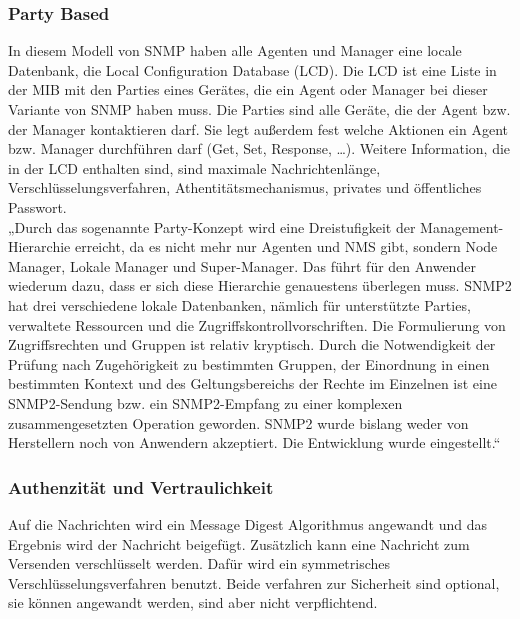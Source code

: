 \documentclass[11pt,a4paper]{article}
\begin{document}
\subsubsection{Party Based}
In diesem Modell von SNMP haben alle Agenten und Manager eine locale Datenbank, die Local Configuration Database (LCD). Die LCD ist eine Liste in der MIB mit den Parties eines Gerätes, die ein Agent oder Manager bei dieser Variante von SNMP haben muss. Die Parties sind alle Geräte, die der Agent bzw. der Manager kontaktieren darf. Sie legt außerdem fest welche Aktionen ein Agent bzw. Manager durchführen darf (Get, Set, Response, …). Weitere Information, die in der LCD enthalten sind, sind maximale Nachrichtenlänge, Verschlüsselungsverfahren, Athentitätsmechanismus, privates und öffentliches Passwort.\\
„Durch das sogenannte Party-Konzept wird eine Dreistufigkeit der Management-Hierarchie erreicht, da es nicht mehr nur Agenten und NMS gibt, sondern Node Manager, Lokale Manager und Super-Manager. Das führt für den Anwender wiederum dazu, dass er sich diese Hierarchie genauestens überlegen muss. SNMP2 hat drei verschiedene lokale Datenbanken, nämlich für unterstützte Parties, verwaltete Ressourcen und die Zugriffskontrollvorschriften. Die Formulierung von Zugriffsrechten und Gruppen ist relativ kryptisch. Durch die Notwendigkeit der Prüfung nach Zugehörigkeit zu bestimmten Gruppen, der Einordnung in einen bestimmten Kontext und des Geltungsbereichs der Rechte im Einzelnen ist eine SNMP2-Sendung bzw. ein SNMP2-Empfang zu einer komplexen zusammengesetzten Operation geworden. SNMP2 wurde bislang weder von Herstellern noch von Anwendern akzeptiert. Die Entwicklung wurde eingestellt.“
\cite{snmpv2PartyBased}\\
\subsubsection{Authenzität und Vertraulichkeit}
Auf die Nachrichten wird ein Message Digest Algorithmus angewandt und das Ergebnis wird der Nachricht beigefügt. Zusätzlich kann eine Nachricht zum Versenden verschlüsselt werden. Dafür wird ein symmetrisches Verschlüsselungsverfahren benutzt. Beide verfahren zur Sicherheit sind optional, sie können angewandt werden, sind aber nicht verpflichtend.\\
\end{document}
